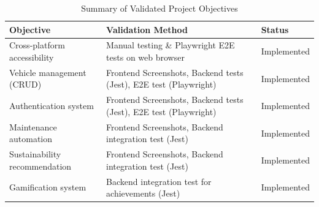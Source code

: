 \begin{table}[h!]
    \centering
    \caption{Summary of Validated Project Objectives}
    \label{tab:validation-summary}
    \begin{tabular}{|p{}|p{}|p{}|}
        \hline
        \textbf{Objective} & \textbf{Validation Method} & \textbf{Status} \\
        \hline \hline
        Cross-platform accessibility & Manual testing \& Playwright E2E tests on web browser & Implemented \\
        \hline
        Vehicle management (CRUD) & Frontend Screenshots, Backend tests (Jest), E2E test (Playwright) & Implemented \\
        \hline
        Authentication system & Frontend Screenshots, Backend tests (Jest), E2E test (Playwright) & Implemented \\
        \hline
        Maintenance automation & Frontend Screenshots, Backend integration test (Jest) & Implemented \\
        \hline
        Sustainability recommendation & Frontend Screenshots, Backend integration test (Jest) & Implemented \\
        \hline
        Gamification system & Backend integration test for achievements (Jest) & Implemented \\
        \hline
    \end{tabular}
\end{table}
